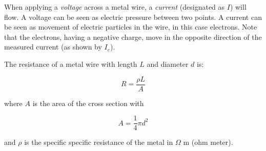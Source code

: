 \documentclass{article}
\begin{document}
When applying a \emph{voltage} across a metal wire, a \emph{current} (designated as $I$) will flow. A voltage can be seen as electric pressure between two points. A current can be seen as movement of electric particles in the wire, in this case electrons. Note that the electrons, having a negative charge, move in the opposite direction of the measured current (as shown by $I_e$).

The resistance of a metal wire with length $L$ and diameter $d$ is:

\begin{equation}
R = \frac{\rho L}{A}
\end{equation}

where $A$ is the area of the cross section with

\begin{equation}
A = \dfrac{1}{4}\pi d^2
\end{equation}

and $\rho$ is the specific specific resistance of the metal in $\Omega$ m (ohm meter).
\end{document}
